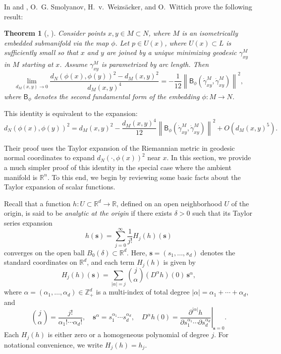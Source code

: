 \documentclass{amsart}
\theoremstyle{Theorem}
\newtheorem{thm}[theorem]{Theorem}
\theoremstyle{remark}
\numberwithin{equation}{section} \numberwithin{figure}{section}
\renewcommand*{\to}{\rightarrow}
\begin{document}
In \cite{S1} and \cite{S2}, O.~G. Smolyanov, H.~v.~Weizsäcker, and O.~Wittich prove the following result:

\begin{thm}[\cite{S1}, \cite{S2}]
Consider points \( x, y \in M \subset N \), where \( M \) is an isometrically embedded submanifold via the map \( \phi \). Let \( p \in U(x) \), where \( U(x) \subset L \) is sufficiently small so that \( x \) and \( y \) are joined by a unique minimizing geodesic \( \gamma_{xy}^{M} \) in \( M \) starting at \( x \). Assume \( \gamma_{xy}^{M} \) is parametrized by arc length. Then
\[
\lim_{d_{M}(x,y)\to 0}\frac{d_{N}(\phi(x),\phi(y))^{2}-d_{M}(x,y)^{2}}{d_{M}(x,y)^{4}} = -\frac{1}{12}\left\|\mathsf{B}_{\phi}(\dot{\gamma}_{xy}^{M},\dot{\gamma}_{xy}^{M})\right\|^{2},
\]
where \( \mathsf{B}_{\phi} \) denotes the second fundamental form of the embedding \( \phi : M \to N \).
\end{thm}

This identity is equivalent to the expansion:
\[
d_{N}(\phi(x),\phi(y))^{2} = d_{M}(x,y)^{2} - \frac{d_{M}(x,y)^{4}}{12} \left\|\mathsf{B}_{\phi}(\dot{\gamma}_{xy}^{M},\dot{\gamma}_{xy}^{M})\right\|^{2} + O(d_{M}(x,y)^{5}).
\]

Their proof uses the Taylor expansion of the Riemannian metric in geodesic normal coordinates to expand \( d_{N}(\cdot, \phi(x))^2 \) near \( x \). In this section, we provide a much simpler proof of this identity in the special case where the ambient manifold is \( \mathbb{R}^n \). To this end, we begin by reviewing some basic facts about the Taylor expansion of scalar functions. 

Recall that a function \( h : U \subset \mathbb{R}^d \to \mathbb{R} \), defined on an open neighborhood \( U \) of the origin, is said to be \emph{analytic at the origin} if there exists \( \delta > 0 \) such that its Taylor series expansion
\begin{equation}\label{t1}
h(\mathbf{s}) = \sum_{j=0}^\infty \frac{1}{j!} H_j(h)(\mathbf{s})
\end{equation}
converges on the open ball \( B_0(\delta) \subset \mathbb{R}^d \). Here, \( \mathbf{s} = (s_1, \dots, s_d) \) denotes the standard coordinates on \( \mathbb{R}^d \), and each term \( H_j(h) \) is given by
\[
H_j(h)(\mathbf{s}) = \sum_{|\alpha| = j} \binom{j}{\alpha} (D^\alpha h)(0) \, \mathbf{s}^\alpha,
\]
where \( \alpha = (\alpha_1, \dots, \alpha_d) \in \mathbb{Z}_{+}^d \) is a multi-index of total degree \( |\alpha| = \alpha_1 + \cdots + \alpha_d \), and
\[
\binom{j}{\alpha} = \frac{j!}{\alpha_1! \cdots \alpha_d!}, \quad
\mathbf{s}^\alpha = s_1^{\alpha_1} \cdots s_d^{\alpha_d}, \quad
D^\alpha h(0) = \left. \frac{\partial^{|\alpha|} h}{\partial s_1^{\alpha_1} \cdots \partial s_d^{\alpha_d}} \right|_{\mathbf{s} = 0}.
\]
Each \( H_j(h) \) is either zero or a homogeneous polynomial of degree \( j \). For notational convenience, we write \( H_j(h) = h_j \).
\end{document}
